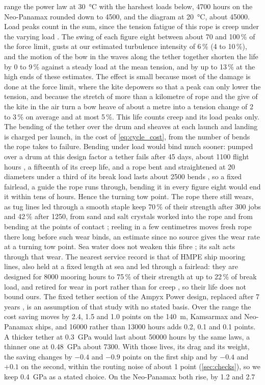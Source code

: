 range the power law at \SI{30}{\celsius} with the harshest loads below, \num{4700} hours on the Neo-Panamax rounded down to \num{4500}, and the diagram at \SI{20}{\celsius}, about \num{45000}. Load peaks count in the sum, since the tension fatigue of this rope is creep under the varying load \citep{humeau2018}. The swing of each figure eight between about 70 and 100\,\% of the force limit, gusts at our estimated turbulence intensity of 6\,\% (4 to 10\,\%), and the motion of the bow in the waves along the tether together shorten the life by 0 to 9\,\% against a steady load at the mean tension, and by up to 13\,\% at the high ends of these estimates. The effect is small because most of the damage is done at the force limit, where the kite depowers so that a peak can only lower the tension, and because the stretch of more than a kilometre of rope and the give of the kite in the air turn a bow heave of about a metre into a tension change of 2 to 3\,\% on average and at most 5\,\%. This life counts creep and its load peaks only. The bending of the tether over the drum and sheaves at each launch and landing is charged per launch, in the cost of \cref{eq:cycle_cost}, from the number of bends the rope takes to failure. Bending under load would bind much sooner: pumped over a drum at this design factor a tether fails after 45 days, about \num{1100} flight hours \citep{bosman2013}, a fifteenth of its creep life, and a rope bent and straightened at 20 diameters under a third of its break load lasts about \num{2500} bends \citep{davies2015}, so a fixed fairlead, a guide the rope runs through, bending it in every figure eight would end it within tens of hours. Hence the turning tow point. The rope there still wears, as tug lines led through a smooth staple keep 70\,\% of their strength after 300 jobs and 42\,\% after \num{1250}, from sand and salt crystals worked into the rope and from bending at the points of contact \citep{mccorkle2004}; reeling in a few centimetres moves fresh rope there long before such wear binds, an estimate since no source gives the wear rate at a turning tow point. Sea water does not weaken this fibre \citep{dsm_sk78_mooring}; its salt acts through that wear. The nearest service record is that of HMPE ship mooring lines, also held at a fixed length at sea and led through a fairlead: they are designed for \num{8000} mooring hours to 75\,\% of their strength at up to 22\,\% of break load, and retired for wear in port rather than for creep \citep{wilhelmsen2022}, so their life does not bound ours. The fixed tether section of the Ampyx Power design, replaced after 7 years \citep{vanhagen2023}, is an assumption of that study with no stated basis. Over the range the cost saving moves by 2.4, 1.5 and 1.0 points on the \SI{140}{m}, Kamsarmax and Neo-Panamax ships, and \num{16000} rather than \num{13000} hours adds 0.2, 0.1 and 0.1 points. A thicker tether at \SI{0.3}{GPa} would last about \num{50000} hours by the same laws, a thinner one at \SI{0.48}{GPa} about \num{7300}. With those lives, its drag and its weight, the saving changes by $-0.4$ and $-0.9$ points on the first ship and by $-0.4$ and $+0.1$ on the second, within the routing noise of about 1 point (\cref{sec:checks}), so we keep \SI{0.4}{GPa} as a stated choice. On the Neo-Panamax both rise, by 1.2 and 2.7 